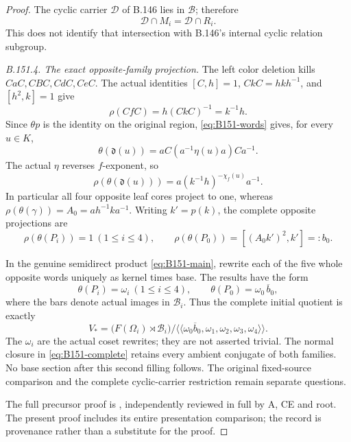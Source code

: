 \begin{proof}
The cyclic carrier \(\mathcal D\) of B.146 lies in \(\mathcal B\);
therefore
\[
 \mathcal D\cap M_i=\mathcal D\cap R_i.
\]
This does not identify that intersection with B.146's internal
cyclic relation subgroup.

\emph{B.151.4. The exact opposite-family projection.}
The left color deletion kills \(CaC,CBC,CdC,CeC\).
The actual identities
\([C,h]=1\), \(CkC=hkh^{-1}\), and \([h^2,k]=1\) give
\[
 \rho(CfC)=h(CkC)^{-1}=k^{-1}h.
\]
Since \(\theta p\) is the identity on the original region,
\eqref{eq:B151-words} gives, for every \(u\in K\),
\[
 \theta(\mathfrak d(u))
       =aC(a^{-1}\eta(u)a)Ca^{-1}.
\]
The actual \(\eta\) reverses \(f\)-exponent, so
\begin{equation}\label{eq:B151-color}
 \rho(\theta(\mathfrak d(u)))
       =a(k^{-1}h)^{-\chi_f(u)}a^{-1}.
\end{equation}
In particular all four opposite leaf cores project to one,
whereas \(\rho(\theta(\gamma))=A_0=ah^{-1}ka^{-1}\).
Writing \(k'=p(k)\), the complete opposite projections are
\begin{equation}\label{eq:B151-opposite-square}
 \rho(\theta(P_i))=1\ (1\le i\le4),\qquad
 \rho(\theta(P_0))=[(A_0k')^2,k']=:b_0.
\end{equation}

In the genuine semidirect product \eqref{eq:B151-main},
rewrite each of the five whole opposite words uniquely as
kernel times base. The results have the form
\[
 \theta(P_i)=\omega_i\ (1\le i\le4),\qquad
 \theta(P_0)=\omega_0\,\overline b_0,
\]
where the bars denote actual images in \(\mathcal B_i\).
Thus the complete initial quotient is exactly
\begin{equation}\label{eq:B151-complete}
 V_*=
 \bigl(F(\Omega_i)\rtimes\mathcal B_i\bigr)/
 \langle\!\langle
 \omega_0\overline b_0,\omega_1,\omega_2,\omega_3,\omega_4
 \rangle\!\rangle.
\end{equation}
The \(\omega_i\) are the actual coset rewrites; they are not
asserted trivial. The normal closure in \eqref{eq:B151-complete}
retains every ambient conjugate of both families. No base
section after this second filling follows. The original
fixed-source comparison and the complete cyclic-carrier
restriction remain separate questions.

\smallskip\noindent
The full precursor proof is
,
independently reviewed in full by A, CE and root. The present
proof includes its entire presentation comparison; the record
is provenance rather than a substitute for the proof.
\end{proof}
